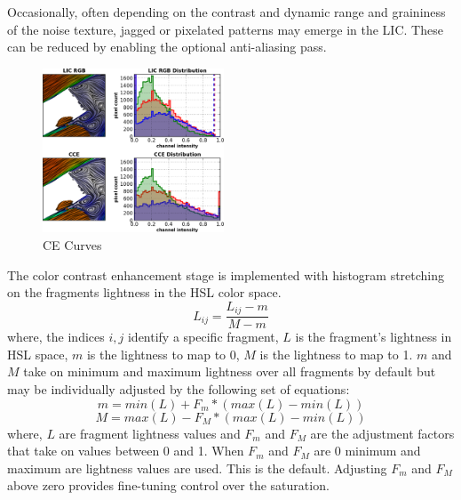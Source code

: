 \documentclass[a4paper,10pt]{article}
\begin{document}
Occasionally, often depending on the contrast and dynamic range and graininess of the noise texture, jagged or pixelated patterns may emerge in the LIC. These can be reduced by enabling the optional anti-aliasing pass.


\begin{figure}[ht]
\centering
\includegraphics[width=0.48\textwidth]{./images-data/dia-serial/color-ce-curves.png}
\caption{CE Curves}
\label{fig:gray-ce-curves2}
\end{figure}
The color contrast enhancement stage is implemented with histogram stretching on the fragments lightness in the HSL color space.
\begin{equation}
L_{ij} = \frac{L_{ij} - m}{M - m}
\end{equation}
where, the indices $i,j$ identify a specific fragment, $L$ is the fragment's lightness in HSL space, $m$ is the lightness to map to 0, $M$ is the lightness to map to 1. $m$ and $M$ take on minimum and maximum lightness over all fragments by default but may be individually adjusted by the following set of equations:
\begin{equation}
m = min(L) + F_{m} * ( max(L) - min(L) )
\end{equation}
\begin{equation}
M = max(L) - F_{M} * ( max(L) - min(L) ) 
\end{equation}
where, $L$ are fragment lightness values and $F_m$ and $F_M$ are the adjustment factors that take on values between 0 and 1. When $F_m$ and $F_M$ are 0 minimum and maximum are lightness values are used. This is the default. Adjusting $F_m$ and $F_M$ above zero provides fine-tuning control over the saturation.
\end{document}
